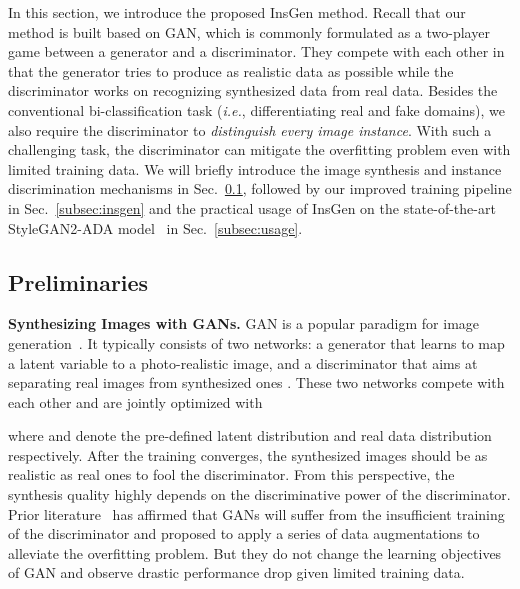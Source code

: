 \documentclass{article}
\begin{document}
In this section, we introduce the proposed InsGen method.
Recall that our method is built based on GAN, which is commonly formulated as a two-player game between a generator and a discriminator.
They compete with each other in that the generator tries to produce as realistic data as possible while the discriminator works on recognizing synthesized data from real data.
Besides the conventional bi-classification task (\textit{i.e.}, differentiating real and fake domains), we also require the discriminator to \textit{distinguish every image instance}.
With such a challenging task, the discriminator can mitigate the overfitting problem even with limited training data.
We will briefly introduce the image synthesis and instance discrimination mechanisms in Sec.~\ref{subsec:preliminary}, followed by our improved training pipeline in Sec.~\ref{subsec:insgen} and the practical usage of InsGen on the state-of-the-art StyleGAN2-ADA model~\cite{karras2020training} in Sec.~\ref{subsec:usage}.


\subsection{Preliminaries}\label{subsec:preliminary}


\textbf{Synthesizing Images with GANs.}
GAN is a popular paradigm for image generation~\cite{goodfellow2014generative}.
It typically consists of two networks: a generator  that learns to map a latent variable  to a photo-realistic image, and a discriminator  that aims at separating real images  from synthesized ones .
These two networks compete with each other and are jointly optimized with

where  and  denote the pre-defined latent distribution and real data distribution respectively.
After the training converges, the synthesized images should be as realistic as real ones to fool the discriminator.
From this perspective, the synthesis quality highly depends on the discriminative power of the discriminator.
Prior literature~\cite{karras2020training, tran2021data, zhao2020differentiable, zhao2020image} has affirmed that GANs will suffer from the insufficient training of the discriminator and proposed to apply a series of data augmentations  to alleviate the overfitting problem.
But they do not change the learning objectives of GAN and observe drastic performance drop given limited training data.
\end{document}
